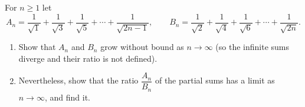 For $n\ge1$ let
\[
A_n=\dfrac{1}{\sqrt1}+\dfrac{1}{\sqrt3}+\dfrac{1}{\sqrt5}+\cdots+\dfrac{1}{\sqrt{2n-1}},\qquad
B_n=\dfrac{1}{\sqrt2}+\dfrac{1}{\sqrt4}+\dfrac{1}{\sqrt6}+\cdots+\dfrac{1}{\sqrt{2n}} .
\]
\begin{enumerate}
\item[(a)] Show that $A_n$ and $B_n$ grow without bound as $n\to\infty$ (so the infinite sums diverge and their ratio is not defined).
\item[(b)] Nevertheless, show that the ratio $\dfrac{A_n}{B_n}$ of the partial sums has a limit as $n\to\infty$, and find it.
\end{enumerate}
